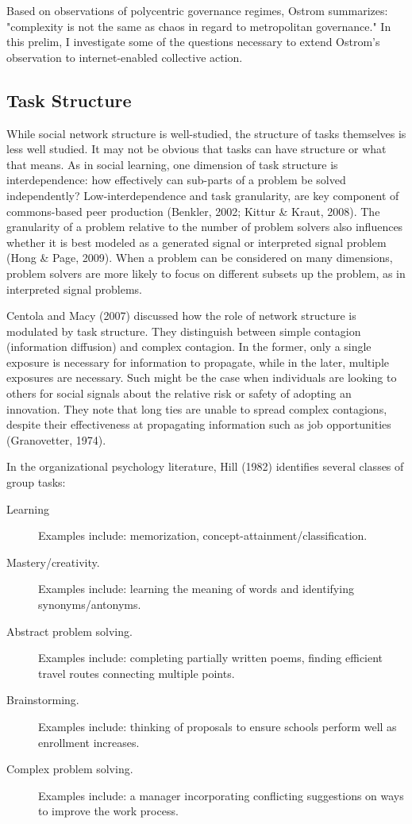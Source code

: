 Based on observations of polycentric governance regimes, Ostrom summarizes: "complexity is not the same as chaos in regard to metropolitan governance." In this prelim, I investigate some of the questions necessary to extend Ostrom's observation to internet-enabled collective action.

\subsection{Task Structure}
While social network structure is well-studied, the structure of tasks themselves is less well studied. It may not be obvious that tasks can have structure or what that means. As in social learning, one dimension of task structure is interdependence: how effectively can sub-parts of a problem be solved independently? Low-interdependence and task granularity, are key component of commons-based peer production (Benkler, 2002; Kittur \& Kraut, 2008). The granularity of a problem relative to the number of problem solvers also influences whether it is best modeled as a generated signal or interpreted signal problem (Hong \& Page, 2009). When a problem can be considered on many dimensions, problem solvers are more likely to focus on different subsets up the problem, as in interpreted signal problems.

Centola and Macy (2007) discussed how the role of network structure is modulated by task structure. They distinguish between simple contagion (information diffusion) and complex contagion. In the former, only a single exposure is necessary for information to propagate, while in the later, multiple exposures are necessary. Such might be the case when individuals are looking to others for social signals about the relative risk or safety of adopting an innovation. They note that long ties are unable to spread complex contagions, despite their effectiveness at propagating information such as job opportunities (Granovetter, 1974).

In the organizational psychology literature, Hill (1982) identifies several classes of group tasks:

\begin{description}
\item[Learning]{Examples include: memorization, concept-attainment/classification.}
\item[Mastery/creativity.]{Examples include: learning the meaning of words and identifying synonyms/antonyms.}
\item[Abstract problem solving.]{Examples include: completing partially written poems, finding efficient travel routes connecting multiple points.}
\item[Brainstorming.]{Examples include: thinking of proposals to ensure schools perform well as enrollment increases.}
\item[Complex problem solving.]{Examples include: a manager incorporating conflicting suggestions on ways to improve the work process.}
\end{description}


